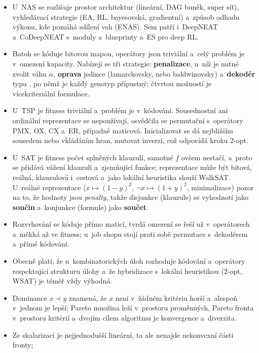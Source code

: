 \documentclass[11pt,a4paper]{article}
\theoremstyle{definition}
\begin{document}
\begin{itemize}
  ze souřadnic neuronů; ten je reprezentovaný pomocí CPPN, tedy DAG s~různými aktivačními
  funkcemi, a~evolvuje se algoritmem NEAT. Díky tomu
  zachycuje symetrie a~regularity.
\item U~NAS se rozlišuje prostor architektur (lineární, DAG buněk, super síť),
  vyhledávací strategie (EA, RL, bayesovská, gradientní) a~způsob odhadu výkonu, kde
  pomáhá sdílení vah (ENAS). Sem patří i~DeepNEAT a~CoDeepNEAT s~moduly a~blueprinty
  a~ES pro deep RL.
\item Batoh se kóduje bitovou mapou, operátory jsou triviální a~celý problém je
  v~omezení kapacity. Nabízejí se tři strategie: \textbf{penalizace}, u~níž je nutné
  zvolit váhu $\alpha$, \textbf{oprava} jedince (lamarckovsky, nebo baldwinovsky)
  a~\textbf{dekodér} typu , po němž je každý genotyp
  přípustný; čtvrtou možností je vícekriteriální formulace.
\item U~TSP je fitness triviální a~problém je v~kódování. Sousednostní ani ordinální
  reprezentace se nepoužívají, osvědčila se permutační s~operátory PMX, OX, CX a~ER,
  případně maticová. Inicializovat se dá nejbližším sousedem nebo vkládáním hran,
  mutovat inverzí, což odpovídá kroku 2-opt.
\item U~SAT je fitness počet splněných klauzulí, samotné $f$ ovšem nestačí, a~proto se
  přidává vážení klauzulí a~zjemňující funkce; reprezentace může být bitová, reálná,
  klauzulová i~cestová a~jako lokální heuristika slouží WalkSAT. U~reálné reprezentace
  ($x \mapsto (1-y)^2$, $\neg x \mapsto (1+y)^2$, minimalizace) pozor na to, že hodnoty
  jsou \emph{penalty}, takže disjunkce (klauzule) se vyhodnotí jako \textbf{součin}
  a~konjunkce (formule) jako \textbf{součet}.
\item Rozvrhování se kóduje přímo maticí, tvrdá omezení se řeší už v~operátorech
  a~měkká až ve fitness; u~job shopu stojí proti sobě permutace s~dekodérem a~přímé
  kódování.
\item Obecně platí, že u~kombinatorických úloh rozhoduje kódování a~operátory
  respektující strukturu úlohy a~že hybridizace s~lokální heuristikou (2-opt, WSAT) je
  téměř vždy výhodná.
\item Dominance $x \prec y$ znamená, že $x$ není v~žádném kritériu horší a~alespoň
  v~jednom je lepší; Pareto množina leží v~prostoru proměnných, Pareto fronta v~prostoru
  kritérií a~dvojím cílem algoritmu je konvergence a~diverzita.
\item Ze skalarizací je nejjednodušší lineární, ta ale nenajde nekonvexní části fronty;

\end{itemize}
\end{document}
